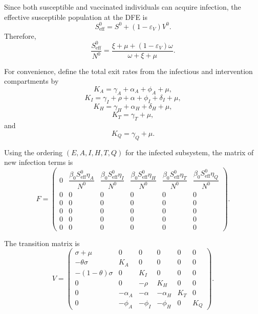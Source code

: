 \documentclass[12pt,a4paper]{article}
\theoremstyle{definition}
\theoremstyle{remark}
\begin{document}
Since both susceptible and vaccinated individuals can acquire infection, the effective susceptible population at the DFE is
\begin{equation}
S_{\mathrm{eff}}^0
=
S^0+(1-\varepsilon_V)V^0.
\end{equation}
Therefore,
\begin{equation}
\frac{S_{\mathrm{eff}}^0}{N^0}
=
\frac{\xi+\mu+(1-\varepsilon_V)\omega}
{\omega+\xi+\mu}.
\end{equation}

For convenience, define the total exit rates from the infectious and intervention compartments by
\begin{equation}
K_A=\gamma_A+\alpha_A+\phi_A+\mu,
\end{equation}
\begin{equation}
K_I=\gamma_I+\rho+\alpha+\phi_I+\delta_I+\mu,
\end{equation}
\begin{equation}
K_H=\gamma_H+\alpha_H+\delta_H+\mu,
\end{equation}
\begin{equation}
K_T=\gamma_T+\mu,
\end{equation}
and
\begin{equation}
K_Q=\gamma_Q+\mu.
\end{equation}

Using the ordering $(E,A,I,H,T,Q)$ for the infected subsystem, the matrix of new infection terms is
\begin{equation}
F=
\begin{pmatrix}
0 &
\dfrac{\beta_0S_{\mathrm{eff}}^0\eta_A}{N^0} &
\dfrac{\beta_0S_{\mathrm{eff}}^0\eta_I}{N^0} &
\dfrac{\beta_0S_{\mathrm{eff}}^0\eta_H}{N^0} &
\dfrac{\beta_0S_{\mathrm{eff}}^0\eta_T}{N^0} &
\dfrac{\beta_0S_{\mathrm{eff}}^0\eta_Q}{N^0}
\\[3mm]
0&0&0&0&0&0\\
0&0&0&0&0&0\\
0&0&0&0&0&0\\
0&0&0&0&0&0\\
0&0&0&0&0&0
\end{pmatrix}.
\end{equation}

The transition matrix is
\begin{equation}
V=
\begin{pmatrix}
\sigma+\mu&0&0&0&0&0\\
-\theta\sigma&K_A&0&0&0&0\\
-(1-\theta)\sigma&0&K_I&0&0&0\\
0&0&-\rho&K_H&0&0\\
0&-\alpha_A&-\alpha&-\alpha_H&K_T&0\\
0&-\phi_A&-\phi_I&-\phi_H&0&K_Q
\end{pmatrix}.
\end{equation}
\end{document}
